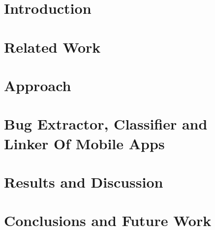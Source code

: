\documentclass{seal_thesis}
\begin{document}
\tableofcontents
\listoffigures
\listoftables
\lstlistoflistings

\mainmatter
\chapter{Introduction}
\label{sec:intro}


\chapter{Related Work}
\label{sec:related}


\chapter{Approach}
\label{sec:approach}


\chapter{\textbf{B}ug \textbf{E}xtractor, \textbf{C}lassifier and \textbf{L}inker \textbf{O}f \textbf{M}obile \textbf{A}pps}


\chapter{Results and Discussion}


\chapter{Conclusions and Future Work}





\backmatter


\end{document}
